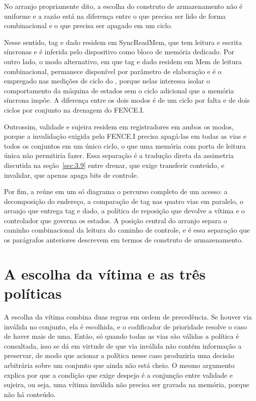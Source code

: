 No arranjo propriamente dito, a escolha do construto de armazenamento não é uniforme e a razão está na diferença entre o que precisa ser lido de forma combinacional e o que precisa ser apagado em um ciclo.

Nesse sentido, tag e dado residem em SyncReadMem, que tem leitura e escrita síncronas e é inferida pelo dispositivo como bloco de memória dedicado. Por outro lado, o modo alternativo, em que tag e dado residem em Mem de leitura combinacional, permanece disponível por parâmetro de elaboração e é o empregado nas medições de ciclo do , porque nelas interessa isolar o comportamento da máquina de estados sem o ciclo adicional que a memória síncrona impõe. A diferença entre os dois modos é de um ciclo por falta e de dois ciclos por conjunto na drenagem do FENCE.I.

Outrossim, validade e sujeira residem em registradores em ambos os modos, porque a invalidação exigida pelo FENCE.I precisa apagá-las em todas as vias e todos os conjuntos em um único ciclo, o que uma memória com porta de leitura única não permitiria fazer. Essa separação é a tradução direta da assimetria discutida na seção~\ref{sec:3.9} entre drenar, que exige transferir conteúdo, e invalidar, que apenas apaga bits de controle.

Por fim, a  reúne em um só diagrama o percurso completo de um acesso: a decomposição do endereço, a comparação de tag nas quatro vias em paralelo, o arranjo que entrega tag e dado, a política de reposição que devolve a vítima e o controlador que governa os estados. A posição central do arranjo separa o caminho combinacional da leitura do caminho de controle, e é essa separação que os parágrafos anteriores descrevem em termos de construto de armazenamento.


\section{A escolha da vítima e as três políticas}\label{sec:3.4}

A escolha da vítima combina duas regras em ordem de precedência. Se houver via inválida no conjunto, ela é escolhida, e o codificador de prioridade resolve o caso de haver mais de uma. Então, só quando todas as vias são válidas a política é consultada, isso se dá em virtude de que via inválida não contém informação a preservar, de modo que acionar a política nesse caso produziria uma decisão arbitrária sobre um conjunto que ainda não está cheio. O mesmo argumento explica por que a condição que exige despejo é a conjunção entre validade e sujeira, ou seja, uma vítima inválida não precisa ser gravada na memória, porque não há conteúdo.

